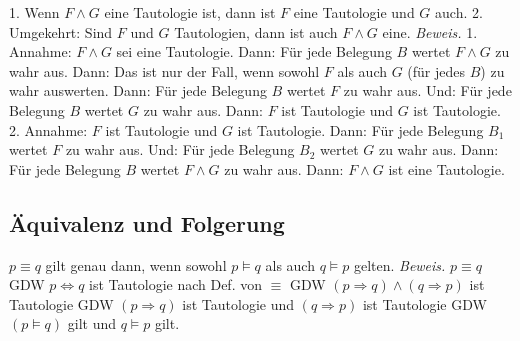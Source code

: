 \begin{comment}


\begin{align*}
	\text{grad }(f_1 f_2) = & f_1 \text{grad }( f_2) + f_2 \text{grad }(f_1 )\\
	\text{grad }F(f) = & F'(f) \text{grad }(f) \\
	\text{div } f\ul{v} = &  \ul{v} \text{grad }( f) + f \text{div } \ul{v}\\
	\text{div } \ul{v} = & \nabla \cdot \ul{v}\\
	\text{curl } \ul{v}_1 + \ul{v}_2 = &  \text{curl } \ul{v}_1 + \text{curl } \ul{v}_2\\
	\text{curl } c\ul{v} = &  c \text{curl } \ul{v} \\
	\text{curl } f \ul{v} = &  f \text{curl }\ul{v}  -  \ul{v} \times \text{grad }(f)\\
	\text{div }\text{curl } \ul{v} = &  0 \\
	\text{curl }\text{grad } f = &  \ul{0} \\
	\text{div }\text{grad } f = & \Delta f \\
	\text{curl }\text{curl } \ul{v} = & \text{grad }  \text{div } \ul{v} - \Delta \ul{v} \\
	\text{div } (\ul{v}_1 \times \ul{v}_2) = & \ul{v}_2 \cdot \text{curl }\ul{v}_1 - \ul{v}_1 \cdot \text{curl }\ul{v}_2 \\
\end{align*}

\end{comment}

1. Wenn $F \wedge G$ eine Tautologie ist, dann ist $F$ eine Tautologie und $G$ auch.
2. Umgekehrt: Sind $F$ und $G$ Tautologien, dann ist auch $F \wedge G$ eine.
\emph{Beweis.}
1. Annahme: $F \wedge G$ sei eine Tautologie.
Dann: Für jede Belegung $B$ wertet $F \wedge G$ zu wahr aus.
Dann: Das ist nur der Fall, wenn sowohl $F$ als auch $G$ (für jedes $B$) zu wahr auswerten.
Dann: Für jede Belegung $B$ wertet $F$ zu wahr aus. Und:
Für jede Belegung $B$ wertet $G$ zu wahr aus.
Dann: $F$ ist Tautologie und $G$ ist Tautologie.
2. Annahme: $F$ ist Tautologie und $G$ ist Tautologie.
Dann: Für jede Belegung $B_1$ wertet $F$ zu wahr aus. Und: Für jede Belegung $B_2$ wertet $G$ zu wahr aus.
Dann: Für jede Belegung $B$ wertet $F \wedge G$ zu wahr aus.
Dann: $F \wedge G$ ist eine Tautologie.
\subsection*{Äquivalenz und Folgerung}
$p\equiv q$ gilt genau dann, wenn sowohl $p\models q$ als auch $q\models p$ gelten. \emph{Beweis.}
$p\equiv q$ GDW $p\Leftrightarrow q$ ist Tautologie nach Def. von $\equiv$
GDW $(p\Rightarrow q) \wedge (q\Rightarrow p)$ ist Tautologie
GDW $(p\Rightarrow q)$ ist Tautologie und $(q\Rightarrow p)$ ist Tautologie
GDW $(p\models q)$ gilt und $q\models p$ gilt.
